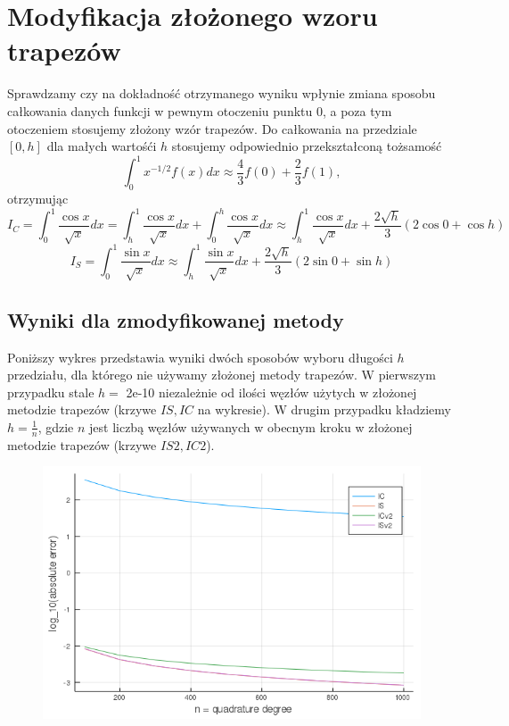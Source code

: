 \documentclass{article}
\begin{document}
\section*{Modyfikacja złożonego wzoru trapezów}
Sprawdzamy czy na dokładność otrzymanego wyniku wpłynie zmiana sposobu całkowania danych funkcji w pewnym otoczeniu punktu 0, a poza tym otoczeniem stosujemy złożony wzór trapezów. Do całkowania na przedziale $[0,h]$ dla małych wartośći $h$ stosujemy odpowiednio przekształconą tożsamość \[
	\int_0^1 x^{-1/2}f(x) dx \approx \frac{4}{3}f(0)+\frac{2}{3}f(1), \]
otrzymując \[
	I_C = \int_0^1 \frac{\cos{x}}{\sqrt{x}} dx = \int_h^1 \frac{\cos{x}}{\sqrt{x}}dx + \int_0^h \frac{\cos{x}}{\sqrt{x}} dx \approx \int_h^1 \frac{\cos{x}}{\sqrt{x}}dx + \frac{2\sqrt{h}}{3}(2\cos{0}+\cos{h}) \]
\[
	I_S = \int_0^1 \frac{\sin{x}}{\sqrt{x}} dx \approx \int_h^1 \frac{\sin{x}}{\sqrt{x}}dx + \frac{2\sqrt{h}}{3}(2\sin{0}+\sin{h}) \]
\subsection*{Wyniki dla zmodyfikowanej metody}
Poniższy wykres przedstawia wyniki dwóch sposobów wyboru długości $h$ przedziału, dla którego nie używamy złożonej metody trapezów. W pierwszym przypadku stale $h=$ 2e-10 niezależnie od ilości węzłów użytych w złożonej metodzie trapezów (krzywe $IS,IC$ na wykresie). W drugim przypadku kładziemy $h=\frac{1}{n}$, gdzie $n$ jest liczbą węzłów używanych w obecnym kroku w złożonej metodzie trapezów (krzywe $IS2,IC2$).


\begin{figure}[ht]
    \includegraphics[scale=0.5]{WykresBlogabsolute.png}
    \label{wykresB}
\end{figure}
\end{document}
